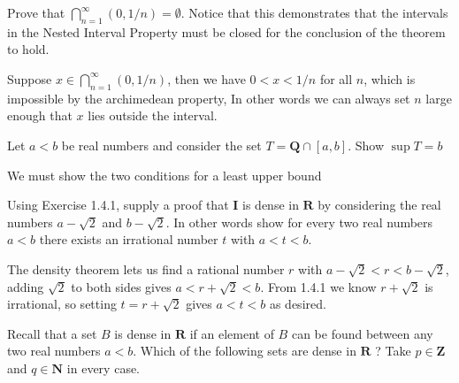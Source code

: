 \begin{exercise}
  Prove that $\bigcap_{n=1}^{\infty}(0,1 / n)=\emptyset$. Notice that this demonstrates that the intervals in the Nested Interval Property must be closed for the conclusion of the theorem to hold.
\end{exercise}

\begin{solution}
  Suppose $x \in \bigcap_{n=1}^\infty (0,1/n)$, then we have $0 < x < 1/n$ for all $n$, which is impossible by the archimedean property, In other words we can always set $n$ large enough that $x$ lies outside the interval.
\end{solution}


\begin{exercise}
  Let $a<b$ be real numbers and consider the set $T=\mathbf{Q} \cap[a, b]$. Show $\sup T=b$
\end{exercise}

\begin{solution}
  We must show the two conditions for a least upper bound
\end{solution}

\begin{exercise}
  Using Exercise 1.4.1, supply a proof that $\mathbf{I}$ is dense in $\mathbf{R}$ by considering the real numbers $a-\sqrt{2}$ and $b-\sqrt{2}$. In other words show for every two real numbers $a<b$ there exists an irrational number $t$ with $a<t<b$.
\end{exercise}

\begin{solution}
  The density theorem lets us find a rational number $r$ with $a-\sqrt2 < r < b-\sqrt2$, adding $\sqrt 2$ to both sides gives $a < r +\sqrt 2< b$. From 1.4.1 we know $r+\sqrt2$ is irrational, so setting $t = r+\sqrt2$ gives $a<t<b$ as desired.
\end{solution}

\begin{exercise}
  Recall that a set $B$ is dense in $\mathbf{R}$ if an element of $B$ can be found between any two real numbers $a<b$. Which of the following sets are dense in $\mathbf{R}$ ? Take $p \in \mathbf{Z}$ and $q \in \mathbf{N}$ in every case.
\end{exercise}

